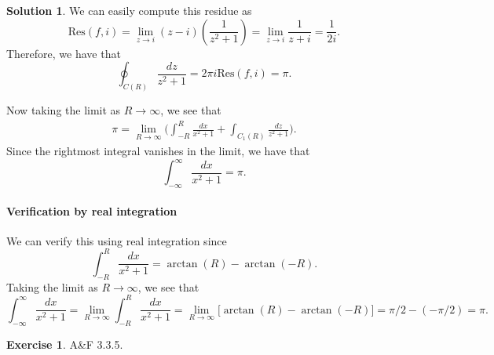 \documentclass[12pt]{article}
\newcommand{\Res}{\text{Res}}
\theoremstyle{definition}
\newtheorem{exer}{Exercise}
\newtheorem{sol}{Solution}
\theoremstyle{remark}
\begin{document}
\begin{sol}
We can easily compute this residue as 
\begin{equation}
    \Res(f, i) = \lim\limits_{z\to i} (z-i)(\frac{1}{z^2+1}) = \lim\limits_{z\to i} \frac{1}{z+i} = \frac{1}{2i}.
\end{equation}
Therefore, we have that
\begin{equation}
    \oint_{C(R)} \frac{dz}{z^2 + 1} = 2\pi i \Res(f, i) = \pi.
\end{equation}

Now taking the limit as $R\to\infty$, we see that
\begin{align}
    \pi = \lim\limits_{R\to \infty}\Big( \int_{-R}^{R} \frac{dx}{x^2+1} + \int_{C_1(R)}  \frac{dz}{z^2 + 1} \Big).
\end{align}
Since the rightmost integral vanishes in the limit, we have that
\begin{equation}
    \int_{-\infty}^{\infty} \frac{dx}{x^2 + 1} = \pi.
\end{equation}

\paragraph{Verification by real integration}%
\label{par:verification_by_real_integration}


We can verify this using real integration since 
\begin{equation}
    \int_{-R}^{R} \frac{dx}{x^2 + 1} = \arctan(R) - \arctan(-R).
\end{equation}
Taking the limit as $R\to \infty$, we see that 
\begin{equation}
    \int_{-\infty}^{\infty} \frac{dx}{x^2 + 1} = \lim\limits_{R\to\infty}  \int_{-R}^{R} \frac{dx}{x^2 + 1} =  \lim\limits_{R\to\infty} \Big[ \arctan(R) - \arctan(-R) \Big] = \pi/2 - (-\pi/2) = \pi.
\end{equation}
\end{sol}
\newpage

\begin{exer}
    A\&F 3.3.5.
\end{exer}
\end{document}
